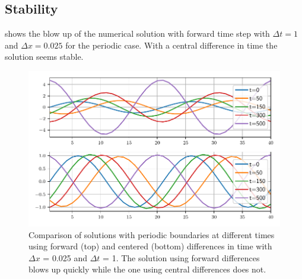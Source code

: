 \begin{appendices}

\section{Stability}\label{sec:stability}

 shows the blow up of the numerical solution with forward
time step with $\Delta t = 1$ and $\Delta x = 0.025$ for the periodic case.
With a central difference in time the solution seems stable.

\begin{figure}[h]
  \centering
  \includegraphics[width=\textwidth]{../figures/compare_dt_1.pdf}
  \caption{Comparison of solutions with periodic boundaries
  at different times using forward (top) and
  centered (bottom) differences in time with $\Delta x$ = 0.025 and $\Delta t$
  = 1. The solution using forward differences
  blows up quickly while the one using central differences does not.}
  \label{fig:compare}
\end{figure}

\end{appendices}
